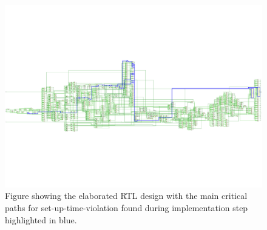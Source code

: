 \begin{figure}[H]
    \centering
    \includegraphics[width=\textwidth, trim=0 160 0 160, clip]{./images/Vivado/setup_implementation.pdf}
    \caption{Figure showing the elaborated RTL design with the main critical paths for set-up-time-violation found during implementation step highlighted in blue.}
    \label{fig:setup_implementation}
\end{figure}

